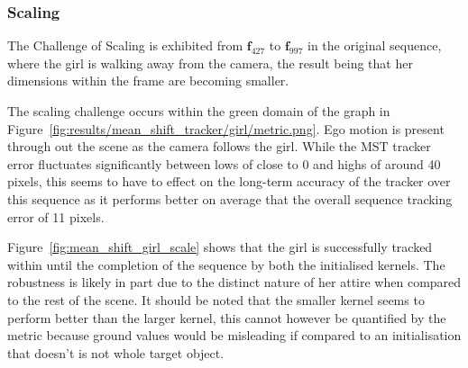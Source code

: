 \subsubsection{Scaling}
The Challenge of Scaling is exhibited from $\mathbf{f}_{427}$ to
$\mathbf{f}_{997}$ in the original sequence, where the girl is walking away from
the camera, the result being that her dimensions within the frame are becoming
smaller.

The scaling challenge occurs within the green domain of the graph in
Figure~\ref{fig:results/mean_shift_tracker/girl/metric.png}.
Ego motion is present through out the scene as the camera follows the girl. 
While the MST tracker error fluctuates significantly between lows of close to 0
and highs of around 40 pixels, this seems to have to effect on the long-term
accuracy of the tracker over this sequence as it performs better on average that
the overall sequence tracking error of 11 pixels.

Figure~\ref{fig:mean_shift_girl_scale} shows that the girl is successfully tracked within until the
completion of the sequence by both the initialised kernels. The robustness is
likely in part due to the distinct nature of her attire when compared to the
rest of the scene. It should be noted that the smaller kernel seems to perform
better than the larger kernel, this cannot however be quantified by the metric
because ground values would be misleading if compared to an initialisation that
doesn't is not whole target object.

